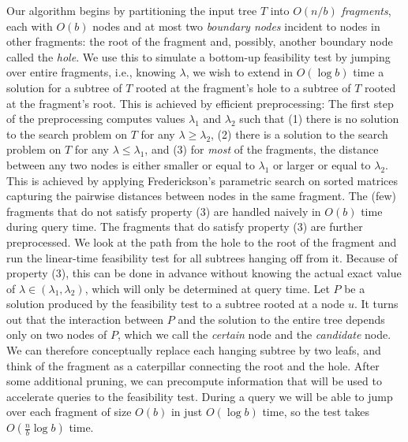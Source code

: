 \documentclass[11pt,a4paper]{article}
\theoremstyle{definition}
\theoremstyle{remark}
\begin{document}
Our algorithm begins by partitioning the input tree $T$ into $O(n/b)$ {\em fragments}, each with $O(b)$ nodes and at most two {\em boundary nodes} incident to nodes in other fragments: the root of the fragment and, possibly, another boundary node called the {\em hole}.
We use this to simulate a bottom-up feasibility test by jumping over entire 
fragments, i.e., knowing $\lambda$, we wish to extend in $O(\log b)$ time a solution for a subtree of $T$ rooted at the fragment's hole to a subtree of $T$ rooted at the fragment's root. This is achieved by efficient preprocessing: 
% 
The first step of the preprocessing computes values $\lambda_1$ and  $\lambda_2$ such that (1) there is no solution to the search problem on $T$ for any $\lambda \geq \lambda_2$, (2) there is a solution to the search problem on $T$ for any $\lambda \le \lambda_1$, and (3) for {\em most} of the fragments, the distance between any two nodes is either smaller or equal to $\lambda_1$ or larger or equal to $\lambda_2$. This is achieved by applying Frederickson's parametric search on sorted matrices capturing the pairwise distances between nodes in the same fragment. The (few) fragments that do not satisfy property (3) are handled naively in $O(b)$ time during query time. 
The fragments that do satisfy property (3) are further preprocessed. We look at the path from the hole to the root of the
fragment and run the linear-time feasibility test for all subtrees hanging off from it. Because of property (3), this can be done in advance without knowing the actual exact value of $\lambda \in (\lambda_1,\lambda_2)$, which will only be determined at query time. 
Let $P$ be a solution produced by the feasibility test to a subtree rooted at a node $u$. It turns out that the interaction between $P$ and the solution to the entire tree depends only on two nodes of $P$, which we call the {\em certain} node and the {\em candidate} node. We can therefore conceptually replace each hanging subtree by two leafs, and think of the fragment as a caterpillar connecting the root and the hole. 
After some additional pruning, we can precompute information 
that will be used to accelerate queries to the feasibility test. During a query we will be able to jump over each fragment of size $O(b)$ in just $O(\log b)$ time, so the test takes $O(\frac{n}{b}\log b)$ time.
\end{document}

